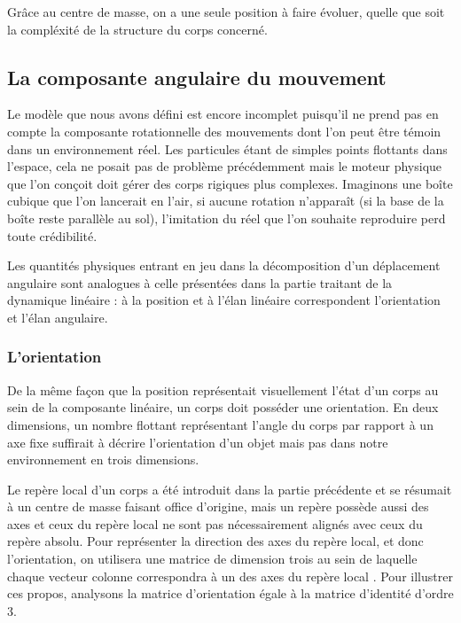 Grâce au centre de masse, on a une seule position à faire évoluer, quelle que soit la compléxité de la structure du corps concerné.

\subsection{La composante angulaire du mouvement}

Le modèle que nous avons défini est encore incomplet puisqu'il ne prend pas en compte la composante rotationnelle des mouvements dont l'on peut être témoin dans un environnement réel. Les particules étant de simples points flottants dans l'espace, cela ne posait pas de problème précédemment mais le moteur physique que l'on conçoit doit gérer des corps rigiques plus complexes. Imaginons une boîte cubique que l'on lancerait en l'air, si aucune rotation n'apparaît (si la base de la boîte reste parallèle au sol), l'imitation du réel que l'on souhaite reproduire perd toute crédibilité.

Les quantités physiques entrant en jeu dans la décomposition d'un déplacement angulaire sont analogues à celle présentées dans la partie traitant de la dynamique linéaire : à la position et à l'élan linéaire correspondent l'orientation et l'élan angulaire.

\subsubsection{L'orientation}

De la même façon que la position représentait visuellement l'état d'un corps au sein de la composante linéaire, un corps doit posséder une orientation. En deux dimensions, un nombre flottant représentant l'angle du corps par rapport à un axe fixe suffirait à décrire l'orientation d'un objet mais pas dans notre environnement en trois dimensions.

Le repère local d'un corps a été introduit dans la partie précédente et se résumait à un centre de masse faisant office d'origine, mais un repère possède aussi des axes et ceux du repère local ne sont pas nécessairement alignés avec ceux du repère absolu. Pour représenter la direction des axes du repère local, et donc l'orientation, on utilisera une matrice de dimension trois au sein de laquelle chaque vecteur colonne correspondra à un des axes du repère local \cite{witkit97}. Pour illustrer ces propos, analysons la matrice d'orientation égale à la matrice d'identité d'ordre 3.

